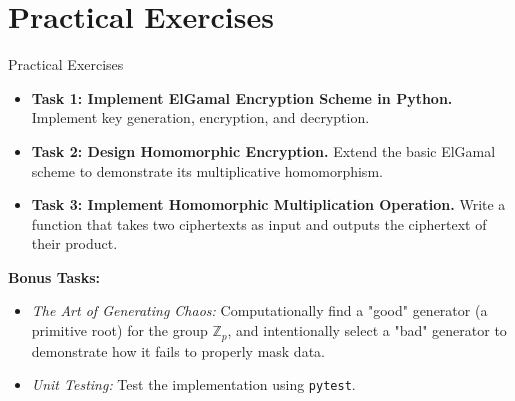 \documentclass[aspectratio=169, 10pt]{beamer}
\begin{document}
\section{Practical Exercises}

\begin{frame}[fragile]{Practical Exercises}
    \begin{itemize}
        \item \textbf{Task 1: Implement ElGamal Encryption Scheme in Python.} Implement key generation, encryption, and decryption.
        \item \textbf{Task 2: Design Homomorphic Encryption.} Extend the basic ElGamal scheme to demonstrate its multiplicative homomorphism.
        \item \textbf{Task 3: Implement Homomorphic Multiplication Operation.} Write a function that takes two ciphertexts as input and outputs the ciphertext of their product.
    \end{itemize}
    
    \vspace{0.3cm}
    \textbf{Bonus Tasks:}
    \begin{itemize}
        \item \textit{The Art of Generating Chaos:} Computationally find a "good" generator (a primitive root) for the group $\mathbb{Z}_p$, and intentionally select a "bad" generator to demonstrate how it fails to properly mask data.
        \item \textit{Unit Testing:} Test the implementation using \texttt{pytest}.
    \end{itemize}
\end{frame}
\end{document}
